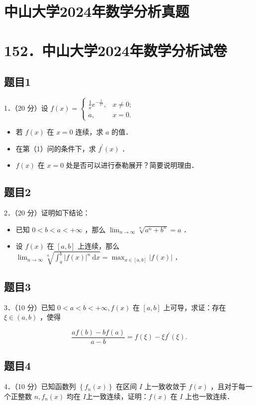 \documentclass{article}
\begin{document}
\section*{中山大学2024年数学分析真题}
\section*{152．中山大学2024年数学分析试卷}

\subsection{题目1}
1．（20 分）设 \(f(x)= \begin{cases}\frac{1}{x} e^{-\frac{1}{x^{2}}}, & x \neq 0 ; \\ a, & x=0 .\end{cases}\)

\begin{itemize}
  \item[（1）] 若 \(f(x)\) 在 \(x=0\) 连续，求 \(a\) 的值．
  \item[（2）] 在第（1）问的条件下，求 \(f^{\prime}(x)\) ．
  \item[（3）] \(f(x)\) 在 \(x=0\) 处是否可以进行泰勒展开？简要说明理由．
\end{itemize}

\subsection{题目2}
2．（20 分）证明如下结论：

\begin{itemize}
  \item[（1）] 已知 \(0<b<a<+\infty\) ，那么 \(\lim _{n \rightarrow \infty} \sqrt[n]{a^{n}+b^{n}}=a\) ．
  \item[（2）] 设 \(f(x)\) 在 \([a, b]\) 上连续，那么 \(\lim _{n \rightarrow \infty} \sqrt[n]{\int_{a}^{b}|f(x)|^{n} \mathrm{~d} x}=\max _{x \in[a, b]}|f(x)|\) ．
\end{itemize}

\subsection{题目3}
3．（10 分）已知 \(0<a<b<+\infty, f(x)\) 在 \([a, b]\) 上可导，求证：存在 \(\xi \in(a, b)\) ，使得

\[
\frac{a f(b)-b f(a)}{a-b}=f(\xi)-\xi f^{\prime}(\xi) .
\]

\subsection{题目4}
4．（10 分）已知函数列 \(\left\{f_{n}(x)\right\}\) 在区间 \(I\) 上一致收敛于 \(f(x)\) ，且对于每一个正整数 \(n, f_{n}(x)\) 均在 \(I\)上一致连续，证明：\(f(x)\) 在 \(I\) 上也一致连续．
\end{document}
